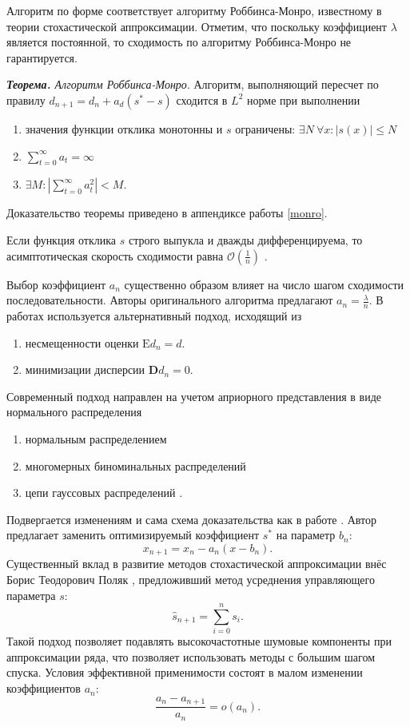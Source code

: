 \documentclass{mipt-thesis-bs}
\begin{document}
Алгоритм по форме соответствует алгоритму Роббинса-Монро\cite{robbins1951stochastic}, известному в теории стохастической аппроксимации. 
Отметим, что поскольку коэффициент $\lambda$ является постоянной, то сходимость по алгоритму Роббинса-Монро не гарантируется.

\textit{\textbf{Теорема.} Алгоритм Роббинса-Монро}. Алгоритм, выполняющий пересчет по правилу $d_{n+1} =d _n + a_d(s^*-s)$ сходится в $L^2$ норме при выполнении \begin{enumerate}
    \item значения функции отклика монотонны и $s$ ограничены: $\exists N\ \forall x : | s(x) | \le N$
    \item $\sum_{t=0}^\infty a_t = \infty$
    \item $\exists M : |\sum_{t=0}^\infty a_t^2 |< M$.
\end{enumerate}

Доказательство теоремы приведено в аппендиксе работы \ref{monro}.

Если функция отклика $s$ строго выпукла и дважды дифференцируема,
то асимптотическая скорость сходимости равна $\mathcal{O}(\frac{1}{n})$ \cite{sacks1958asymptotic}.

Выбор коэффициент $a_n$ существенно образом влияет на число шагом сходимости последовательности.
Авторы оригинального алгоритма предлагают $a_n = \frac{\lambda}{n}$. В работах \cite{lai1979adaptive}
используется альтернативный подход, исходящий из \begin{enumerate}
    \item несмещенности оценки $\mathrm{E}d_n=d$.
    \item минимизации дисперсии $\mathbf{D} d_n=0$.
\end{enumerate}
Современный подход направлен на учетом априорного представления в виде нормального распределения \begin{enumerate}
    \item нормальным распределением \cite{joseph2004efficient}
    \item многомерных биноминальных распределений \cite{xiong2018efficient}
    \item цепи гауссовых распределений \cite{liu2024robbins}.
\end{enumerate}
Подвергается изменениям и сама схема доказательства как в работе \cite{joseph2004efficient}.
Автор предлагает заменить оптимизируемый коэффициент $s^*$ на параметр $b_n$:
$$
    x_{n+1} = x_{n} - a_n(x -b_n).
$$
Существенный вклад в развитие методов стохастической аппроксимации внёс Борис Теодорович Поляк \cite{polyak1990new},
предложивший метод усреднения управляющего параметра $s$:
\begin{equation}
    \hat{s}_{n+1} = \sum_{i=0}^n s_i.
    \label{polyak}
\end{equation}
    Такой подход позволяет подавлять
высокочастотные шумовые компоненты при аппроксимации ряда,
что позволяет использовать методы с большим шагом спуска.
Условия эффективной применимости состоят в малом изменении коэффициентов $a_n$:
\begin{equation}
   \frac{a_{n}-a_{n+1}}{a_{n}}=\mathit{o}(a_{n}).
   \label{polyak_assumptions}
\end{equation}
\end{document}
